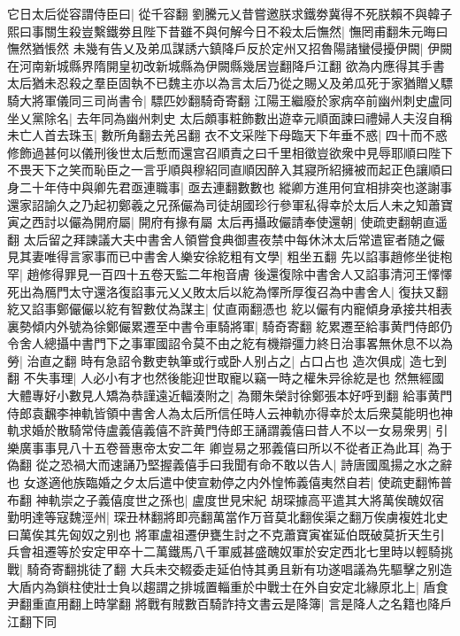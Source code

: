 它日太后從容謂侍臣曰|{
	從千容翻}
劉騰元乂昔嘗邀朕求鐵劵冀得不死朕賴不與韓子熙曰事關生殺豈繫鐵劵且陛下昔雖不與何解今日不殺太后憮然|{
	憮罔甫翻朱元晦曰憮然猶悵然}
未幾有告乂及弟瓜謀誘六鎮降戶反於定州又招魯陽諸蠻侵擾伊闕|{
	伊闕在河南新城縣界隋開皇初改新城縣為伊闕縣幾居豈翻降戶江翻}
欲為内應得其手書太后猶未忍殺之羣臣固執不已魏主亦以為言太后乃從之賜乂及弟瓜死于家猶贈乂驃騎大將軍儀同三司尚書令|{
	驃匹妙翻騎奇寄翻}
江陽王繼廢於家病卒前幽州刺史盧同坐乂黨除名|{
	去年同為幽州刺史}
太后頗事粧飾數出遊幸元順面諫曰禮婦人夫沒自稱未亡人首去珠玉|{
	數所角翻去羌呂翻}
衣不文采陛下母臨天下年垂不惑|{
	四十而不惑}
修飾過甚何以儀刑後世太后慙而還宫召順責之曰千里相徵豈欲衆中見辱耶順曰陛下不畏天下之笑而恥臣之一言乎順與穆紹同直順因醉入其寢所紹擁被而起正色讓順曰身二十年侍中與卿先君亟連職事|{
	亟去連翻數數也}
縱卿方進用何宜相排突也遂謝事還家詔諭久之乃起初鄭羲之兄孫儼為司徒胡國珍行參軍私得幸於太后人未之知蕭寶寅之西討以儼為開府屬|{
	開府有掾有屬}
太后再攝政儼請奉使還朝|{
	使疏吏翻朝直遥翻}
太后留之拜諫議大夫中書舍人領嘗食典御晝夜禁中每休沐太后常遣宦者随之儼見其妻唯得言家事而已中書舍人樂安徐紇粗有文學|{
	粗坐五翻}
先以諂事趙修坐徙枹罕|{
	趙修得罪見一百四十五卷天監二年枹音膚}
後還復除中書舍人又諂事清河王懌懌死出為鴈門太守還洛復諂事元乂乂敗太后以紇為懌所厚復召為中書舍人|{
	復扶又翻}
紇又諂事鄭儼儼以紇有智數仗為謀主|{
	仗直兩翻憑也}
紇以儼有内寵傾身承接共相表裏勢傾内外號為徐鄭儼累遷至中書令車騎將軍|{
	騎奇寄翻}
紇累遷至給事黄門侍郎仍令舍人總攝中書門下之事軍國詔令莫不由之紇有機辯彊力終日治事畧無休息不以為勞|{
	治直之翻}
時有急詔令數吏執筆或行或卧人别占之|{
	占口占也}
造次俱成|{
	造七到翻}
不失事理|{
	人必小有才也然後能迎世取寵以竊一時之權朱异徐紇是也}
然無經國大體專好小數見人矯為恭謹遠近輻湊附之|{
	為爾朱榮討徐鄭張本好呼到翻}
給事黄門侍郎袁飜李神軌皆領中書舍人為太后所信任時人云神軌亦得幸於太后衆莫能明也神軌求婚於散騎常侍盧義僖義僖不許黄門侍郎王誦謂義僖曰昔人不以一女易衆男|{
	引樂廣事事見八十五卷晉惠帝太安二年}
卿豈易之邪義僖曰所以不從者正為此耳|{
	為于偽翻}
從之恐禍大而速誦乃堅握義僖手曰我聞有命不敢以告人|{
	詩唐國風揚之水之辭也}
女遂適他族臨婚之夕太后遣中使宣勅停之内外惶怖義僖夷然自若|{
	使疏吏翻怖普布翻}
神軌崇之子義僖度世之孫也|{
	盧度世見宋紀}
胡琛據高平遣其大將萬俟醜奴宿勤明達等寇魏涇州|{
	琛丑林翻將即亮翻萬當作万音莫北翻俟渠之翻万俟虜複姓北史曰萬俟其先匈奴之别也}
將軍盧祖遷伊甕生討之不克蕭寶寅崔延伯既破莫折天生引兵會祖遷等於安定甲卒十二萬鐵馬八千軍威甚盛醜奴軍於安定西北七里時以輕騎挑戰|{
	騎奇寄翻挑徒了翻}
大兵未交輟委走延伯恃其勇且新有功遂唱議為先驅擊之别造大盾内為鎖柱使壯士負以趨謂之排城置輜重於中戰士在外自安定北緣原北上|{
	盾食尹翻重直用翻上時掌翻}
將戰有賊數百騎詐持文書云是降簿|{
	言是降人之名籍也降戶江翻下同}
